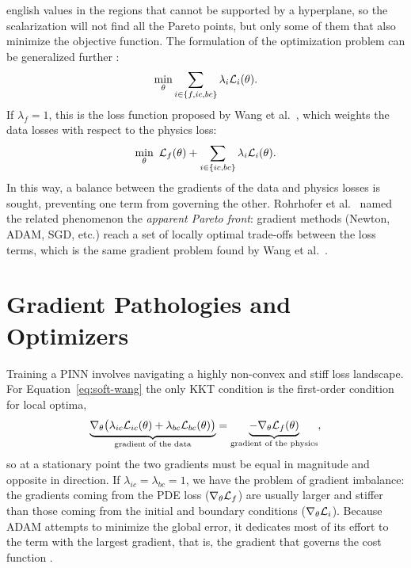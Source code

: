 \begin{hyphenrules}{english}
values in the regions that cannot be supported by a hyperplane, so the scalarization will not find all
the Pareto points, but only some of them that also minimize the objective function. The formulation of
the optimization problem can be generalized further \cite{rohrhofer2023}:
\begin{equation}
  \min_{\theta}\sum_{i\in\{f,ic,bc\}}\lambda_i\mathcal{L}_i(\theta).
  \label{eq:soft-general}
\end{equation}
If $\lambda_f=1$, this is the loss function proposed by Wang et al.~\cite{wang2021gradient}, which weights the
data losses with respect to the physics loss:
\begin{equation}
  \min_{\theta}\ \Loss_f(\theta)+\sum_{i\in\{ic,bc\}}\lambda_i\Loss_i(\theta).
  \label{eq:soft-wang}
\end{equation}
In this way, a balance between the gradients of the data and physics losses is sought, preventing one
term from governing the other. Rohrhofer et al.~\cite{rohrhofer2023} named the related phenomenon the \emph{apparent
Pareto front}: gradient methods (Newton, ADAM, SGD, etc.) reach a set of locally optimal trade-offs
between the loss terms, which is the same gradient problem found by Wang et al.~\cite{wang2021gradient}.

\section{Gradient Pathologies and Optimizers}\label{sec:gradient-pathologies}

Training a PINN involves navigating a highly non-convex and stiff loss landscape. For
Equation~\eqref{eq:soft-wang} the only KKT condition is the first-order condition for local optima,
\begin{equation}
  \underbrace{\nabla_\theta\big(\lambda_{ic}\mathcal{L}_{ic}(\theta)+\lambda_{bc}\mathcal{L}_{bc}(\theta)\big)}_{\text{gradient of the data}}
  =\underbrace{-\nabla_\theta\mathcal{L}_f(\theta)}_{\text{gradient of the physics}},
  \label{eq:kkt-soft}
\end{equation}
so at a stationary point the two gradients must be equal in magnitude and opposite in direction. If
$\lambda_{ic}=\lambda_{bc}=1$, we have the problem of gradient imbalance: the gradients coming from the
PDE loss ($\nabla_\theta\mathcal{L}_f$) are usually larger and stiffer than those coming from the initial and
boundary conditions ($\nabla_\theta\mathcal{L}_i$). Because ADAM attempts to minimize the global error, it
dedicates most of its effort to the term with the largest gradient, that is, the gradient that governs
the cost function \cite{wang2021gradient}.


\end{hyphenrules}
